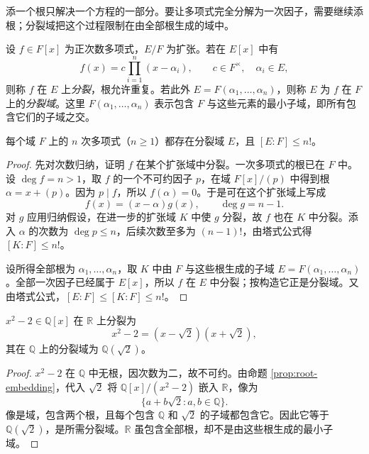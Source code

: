 \documentclass[lang=cn,a4paper,fontset=none,zihao=false,10pt,openany,twoside]{beautybook}
\numberwithin{algorithm}{chapter}
\begin{document}
添一个根只解决一个方程的一部分。要让多项式完全分解为一次因子，需要继续添根；分裂域把这个过程限制在由全部根生成的域中。
\begin{definition}[分裂与分裂域]
设 $f\in F[x]$ 为正次数多项式，$E/F$ 为扩张。若在 $E[x]$ 中有
\[
 f(x)=c\prod_{i=1}^n(x-\alpha_i),\qquad c\in F^\times,\quad\alpha_i\in E,
\]
则称 $f$ 在 $E$ 上\emph{分裂}，根允许重复。若此外 $E=F(\alpha_1,\ldots,\alpha_n)$，则称 $E$ 为 $f$ 在 $F$ 上的\emph{分裂域}。这里 $F(\alpha_1,\ldots,\alpha_n)$ 表示包含 $F$ 与这些元素的最小子域，即所有包含它们的子域之交。
\end{definition}

\Needspace{50mm}
\begin{theorem}[分裂域的存在性]\label{thm:splitting-existence}
每个域 $F$ 上的 $n$ 次多项式（$n\ge1$）都存在分裂域 $E$，且 $[E:F]\le n!$。
\end{theorem}
\begin{proof}
先对次数归纳，证明 $f$ 在某个扩张域中分裂。一次多项式的根已在 $F$ 中。设 $\deg f=n>1$，取 $f$ 的一个不可约因子 $p$，在域 $F[x]/(p)$ 中得到根 $\alpha=x+(p)$。因为 $p\mid f$，所以 $f(\alpha)=0$。于是可在这个扩张域上写成
\[
 f(x)=(x-\alpha)g(x),\qquad\deg g=n-1.
\]
对 $g$ 应用归纳假设，在进一步的扩张域 $K$ 中使 $g$ 分裂，故 $f$ 也在 $K$ 中分裂。添入 $\alpha$ 的次数为 $\deg p\le n$，后续次数至多为 $(n-1)!$，由塔式公式得 $[K:F]\le n!$。

设所得全部根为 $\alpha_1,\ldots,\alpha_n$，取 $K$ 中由 $F$ 与这些根生成的子域 $E=F(\alpha_1,\ldots,\alpha_n)$。全部一次因子已经属于 $E[x]$，所以 $f$ 在 $E$ 中分裂；按构造它正是分裂域。又由塔式公式，$[E:F]\le[K:F]\le n!$。
\end{proof}

\begin{example}
$x^2-2\in\mathbb Q[x]$ 在 $\mathbb R$ 上分裂为
\[
 x^2-2=(x-\sqrt2)(x+\sqrt2),
\]
其在 $\mathbb Q$ 上的分裂域为 $\mathbb Q(\sqrt2)$。
\end{example}
\begin{proof}
$x^2-2$ 在 $\mathbb Q$ 中无根，因次数为二，故不可约。由命题 \ref{prop:root-embedding}，代入 $\sqrt2$ 将 $\mathbb Q[x]/(x^2-2)$ 嵌入 $\mathbb R$，像为
\[
 \{a+b\sqrt2:a,b\in\mathbb Q\}.
\]
像是域，包含两个根，且每个包含 $\mathbb Q$ 和 $\sqrt2$ 的子域都包含它。因此它等于 $\mathbb Q(\sqrt2)$，是所需分裂域。$\mathbb R$ 虽包含全部根，却不是由这些根生成的最小子域。
\end{proof}
\end{document}
